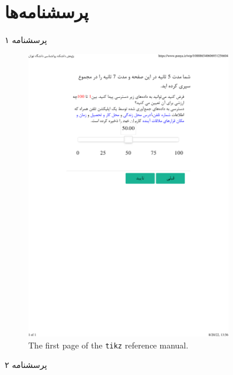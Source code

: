     
\let\Chapter\chapter
    
\chapter{پرسشنامه‌ها}
\label{app:questionnaires}
پرسشنامه ۱
% 
% 
\begin{figure}[htpb]
    \centering
    \includegraphics[width=0.8\textwidth]{./questionnares/wtp.pdf}
    \caption{The first page of the \texttt{tikz} reference manual.}
    \label{fig:tikzpgf}
\end{figure}
پرسشنامه ۲


